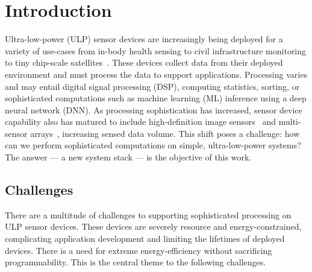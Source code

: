 \chapter{Introduction}
\label{chapter:intro}
Ultra-low-power (ULP) sensor devices are increasingly being deployed for a variety of use-cases from in-body health sensing to civil infrastructure monitoring to tiny chip-scale satellites~\cite{kicksat}.
% 
These devices collect data from their deployed environment and must process the 
data to support applications.
% 
Processing varies and may entail digital signal
processing (DSP), computing statistics, sorting, or sophisticated computations
such as machine learning (ML) inference using a deep neural network (DNN).
% 
As processing sophistication has increased, sensor device capability also
has matured to include high-definition image sensors~\cite{naderiparizi2018towards} and multi-sensor arrays~\cite{laput2017synthetic}, increasing sensed data volume.
%
This shift poses a challenge: how can we perform sophisticated computations
on simple, ultra-low-power systems?
% 
The answer --- a new system stack --- is the objective of this work.


\section{Challenges}
There are a multitude of challenges to supporting sophisticated processing on ULP sensor devices.
% 
These devices are severely resource and energy-constrained, complicating application development and limiting the lifetimes of deployed devices.
% 
There is a need for extreme energy-efficiency without sacrificing programmability.
% 
This is the central theme to the following challenges.

